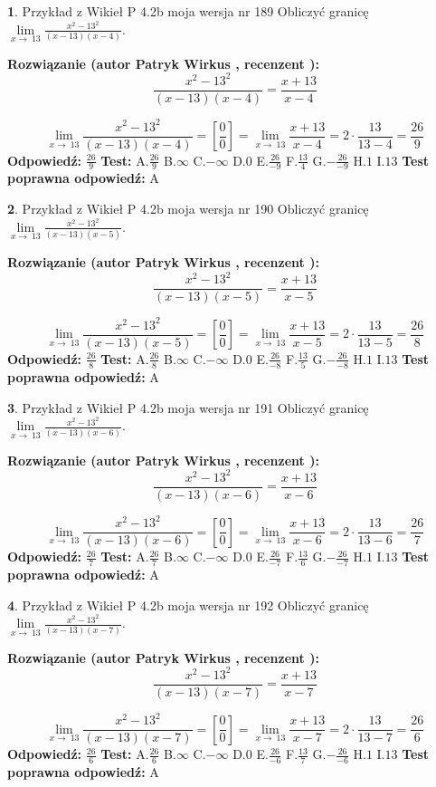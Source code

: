 \documentclass[12pt, a4paper]{article}
\theoremstyle{definition} %
\newtheorem{zad}{}
\newcommand{\zadStart}[1]{\begin{zad}#1\newline}
\newcommand{\zadStop}{\end{zad}}
\newcommand{\rozwStart}[2]{\noindent \textbf{Rozwiązanie (autor #1 , recenzent #2): }\newline}
\newcommand{\rozwStop}{\newline}
\newcommand{\odpStart}{\noindent \textbf{Odpowiedź:}\newline}
\newcommand{\odpStop}{\newline}
\newcommand{\testStart}{\noindent \textbf{Test:}\newline}
\newcommand{\testStop}{\newline}
\newcommand{\kluczStart}{\noindent \textbf{Test poprawna odpowiedź:}\newline}
\newcommand{\kluczStop}{\newline}
\begin{document}
\zadStart{Przykład z Wikieł P 4.2b moja wersja nr 189}
Obliczyć granicę $\lim\limits_{x\to\ 13}\frac{x^{2}-13^{2}}{(x-13)(x-4)}$.
\zadStop
\rozwStart{Patryk Wirkus}{}
$$\frac{x^{2}-13^{2}}{(x-13)(x-4)}=\frac{x+13}{x-4}$$

$$\lim\limits_{x\to\ 13}\frac{x^{2}-13^{2}}{(x-13)(x-4)}=[\frac{0}{0}]=\lim\limits_{x\to\ 13}\frac{x+13}{x-4}=2 \cdot \frac{13}{13-4} = \frac{26}{9}$$
\rozwStop
\odpStart
$\frac{26}{9}$
\odpStop
\testStart
A.$\frac{26}{9}$
B.$\infty$
C.$-\infty$
D.$0$
E.$\frac{26}{-9}$
F.$\frac{13}{4}$
G.$-\frac{26}{-9}$
H.$1$
I.$13$
\testStop
\kluczStart
A
\kluczStop



\zadStart{Przykład z Wikieł P 4.2b moja wersja nr 190}
Obliczyć granicę $\lim\limits_{x\to\ 13}\frac{x^{2}-13^{2}}{(x-13)(x-5)}$.
\zadStop
\rozwStart{Patryk Wirkus}{}
$$\frac{x^{2}-13^{2}}{(x-13)(x-5)}=\frac{x+13}{x-5}$$

$$\lim\limits_{x\to\ 13}\frac{x^{2}-13^{2}}{(x-13)(x-5)}=[\frac{0}{0}]=\lim\limits_{x\to\ 13}\frac{x+13}{x-5}=2 \cdot \frac{13}{13-5} = \frac{26}{8}$$
\rozwStop
\odpStart
$\frac{26}{8}$
\odpStop
\testStart
A.$\frac{26}{8}$
B.$\infty$
C.$-\infty$
D.$0$
E.$\frac{26}{-8}$
F.$\frac{13}{5}$
G.$-\frac{26}{-8}$
H.$1$
I.$13$
\testStop
\kluczStart
A
\kluczStop



\zadStart{Przykład z Wikieł P 4.2b moja wersja nr 191}
Obliczyć granicę $\lim\limits_{x\to\ 13}\frac{x^{2}-13^{2}}{(x-13)(x-6)}$.
\zadStop
\rozwStart{Patryk Wirkus}{}
$$\frac{x^{2}-13^{2}}{(x-13)(x-6)}=\frac{x+13}{x-6}$$

$$\lim\limits_{x\to\ 13}\frac{x^{2}-13^{2}}{(x-13)(x-6)}=[\frac{0}{0}]=\lim\limits_{x\to\ 13}\frac{x+13}{x-6}=2 \cdot \frac{13}{13-6} = \frac{26}{7}$$
\rozwStop
\odpStart
$\frac{26}{7}$
\odpStop
\testStart
A.$\frac{26}{7}$
B.$\infty$
C.$-\infty$
D.$0$
E.$\frac{26}{-7}$
F.$\frac{13}{6}$
G.$-\frac{26}{-7}$
H.$1$
I.$13$
\testStop
\kluczStart
A
\kluczStop



\zadStart{Przykład z Wikieł P 4.2b moja wersja nr 192}
Obliczyć granicę $\lim\limits_{x\to\ 13}\frac{x^{2}-13^{2}}{(x-13)(x-7)}$.
\zadStop
\rozwStart{Patryk Wirkus}{}
$$\frac{x^{2}-13^{2}}{(x-13)(x-7)}=\frac{x+13}{x-7}$$

$$\lim\limits_{x\to\ 13}\frac{x^{2}-13^{2}}{(x-13)(x-7)}=[\frac{0}{0}]=\lim\limits_{x\to\ 13}\frac{x+13}{x-7}=2 \cdot \frac{13}{13-7} = \frac{26}{6}$$
\rozwStop
\odpStart
$\frac{26}{6}$
\odpStop
\testStart
A.$\frac{26}{6}$
B.$\infty$
C.$-\infty$
D.$0$
E.$\frac{26}{-6}$
F.$\frac{13}{7}$
G.$-\frac{26}{-6}$
H.$1$
I.$13$
\testStop
\kluczStart
A
\kluczStop
\end{document}
